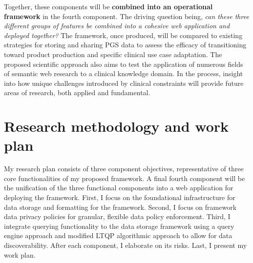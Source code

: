 \documentclass[a4paper,11pt]{article}
\begin{document}
\begin{refsection}
Together, these components will be \textbf{combined into an operational framework} in the fourth component. 
The driving question being, \textit{can these three different groups of features be combined into a cohesive web application and deployed together?}
The framework, once produced, will be compared to existing strategies for storing and sharing PGS data to assess the efficacy of transitioning toward product production and specific clinical use case adaptation.
The proposed scientific approach also aims to test the application of numerous fields of semantic web research to a clinical knowledge domain. 
In the process, insight into how unique challenges introduced by clinical constraints will provide future areas of research, both applied and fundamental.

\newpage

\section{Research methodology and work plan}

\begin{comment}
Elaborate the different envisaged steps (experiments/activities) in your research, and motivate strategic choices in view of reaching the objectives. 
Describe the set-up and cohesion of the work packages including intermediate goals (milestones).
Show where the proposed methodology (research approach) is according to the state of the art and where it is novel. 

Discuss risks that might endanger reaching project objectives and the contingency plans to be put in place should this risk occur.
Use a table or graphic representation of the planned course of activities (timing work packages, milestones, critical path) over the 4-years grant period.
\end{comment}

\medskip

\noindent
My research plan consists of three component objectives, representative of three core functionalities of my proposed framework.
A final fourth component will be the unification of the three functional components into a web application for deploying the framework.
%
First, I focus on the foundational infrastructure for data storage and formatting for the framework.
%
Second, I focus on framework data privacy policies for granular, flexible data policy enforcement.
%
Third, I integrate querying functionality to the data storage framework using a query engine approach and modified LTQP algorithmic approach to allow for data discoverability.
%
After each component, I elaborate on its risks.
Last, I present my work plan.


\end{refsection}
\end{document}
